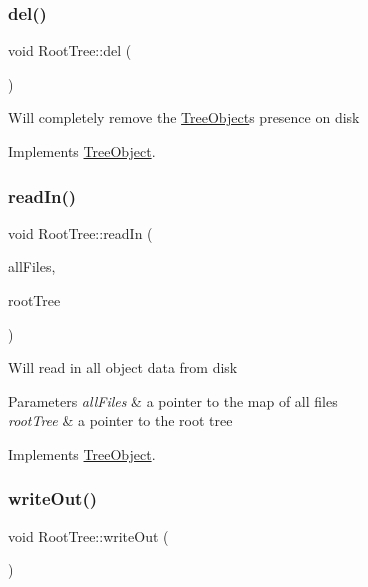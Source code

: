 \subsubsection{\texorpdfstring{del()}{del()}}
{\footnotesize\ttfamily void Root\+Tree\+::del (\begin{DoxyParamCaption}{ }\end{DoxyParamCaption})\hspace{0.3cm}{\ttfamily [virtual]}}

Will completely remove the \mbox{\hyperlink{classTreeObject}{Tree\+Object}}\textquotesingle{}s presence on disk 

Implements \mbox{\hyperlink{classTreeObject_af390b7479aa972888e594c07a85740b6}{Tree\+Object}}.

\mbox{\label{classRootTree_a1d1084e9fc3333f10b3146d096da1dd4}} 
\subsubsection{\texorpdfstring{read\+In()}{readIn()}}
{\footnotesize\ttfamily void Root\+Tree\+::read\+In (\begin{DoxyParamCaption}\item[{unordered\+\_\+multimap$<$ string, \mbox{\hyperlink{classFileInfo}{File\+Info}} $\ast$$>$ $\ast$}]{all\+Files,  }\item[{\mbox{\hyperlink{classRootTree}{Root\+Tree}} $\ast$}]{root\+Tree }\end{DoxyParamCaption})\hspace{0.3cm}{\ttfamily [virtual]}}

Will read in all object data from disk 
\begin{DoxyParams}{Parameters}
{\em all\+Files} & a pointer to the map of all files \\
\hline
{\em root\+Tree} & a pointer to the root tree \\
\hline
\end{DoxyParams}


Implements \mbox{\hyperlink{classTreeObject_a8247e79f2b4c1760649ac6f1af1c583f}{Tree\+Object}}.

\mbox{\label{classRootTree_a6df5a227c60c44ad84207eb296c52af9}} 
\subsubsection{\texorpdfstring{write\+Out()}{writeOut()}}
{\footnotesize\ttfamily void Root\+Tree\+::write\+Out (\begin{DoxyParamCaption}{ }\end{DoxyParamCaption})\hspace{0.3cm}{\ttfamily [virtual]}}


